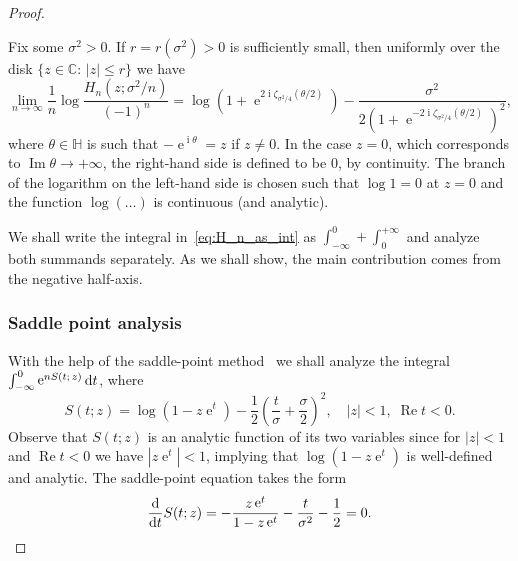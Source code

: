 \documentclass[AHL,Unicode,longabstracts,published]{cedram}
\DeclareMathOperator{\Ree}{Re}
\DeclareMathOperator{\Imm}{Im}
\DeclareMathOperator{\eee}{e}
\DeclareMathOperator{\ii}{i}
\newcommand{\bH}{\mathbb{H}}
\newcommand{\C}{\mathbb{C}}
\newcommand*\dint{\text{\normalfont d}}
\begin{document}
\begin{proof}
\begin{prop}\label{prop:log_asympt_H_n_small_z}
Fix some $\sigma^2>0$. If $r=r(\sigma^2)>0$ is sufficiently small, then uniformly over the disk $\{z\in \C:\, |z|\leq r\}$ we have
\[
\lim_{n\to\infty}
\frac 1n \log \frac {H_n\left(z;\sigma^2/n\right)}{(-1)^n} =
\log \left(1+\eee^{2\ii \zeta_{\sigma^2/4}(\theta/2)}\right) - \frac{\sigma^2}{2\left(1+ \eee^{-2 \ii \zeta_{\sigma^2/4}(\theta/2)}\right)^2},
\]
where $\theta\in \bH$ is such that $-\eee^{\ii \theta} = z$ if $z\neq 0$. In the case $z=0$, which corresponds to $\Imm \theta \to +\infty$, the right-hand side is defined to be $0$, by continuity. The branch of the logarithm on the left-hand side is chosen such that $\log 1=0$ at $z=0$ and the function $\log(\ldots)$ is continuous (and analytic).
\end{prop}



We shall write the integral in~\eqref{eq:H_n_as_int} as $\int_{-\infty}^0 + \int_{0}^{+\infty}$ and analyze both summands separately. As we shall show, the main contribution comes from the negative half-axis.


\subsubsection*{Saddle point analysis}
With the help of the saddle-point method~\cite[\S 45.4, p.~423]{sidorov_fedoryuk_shabunin_book} we shall analyze the integral $\int_{-\infty}^0 \eee^{n S(t;\,z)} \dint t$, where
\begin{equation}\label{eq:S_def}
S(t;z) = \log (1-z\eee^t) - \frac 12 \left(\frac{t}{\sigma} + \frac \sigma 2\right)^2,
\quad |z|<1, \; \Ree t < 0.
\end{equation}
Observe that $S(t;z)$ is an analytic function of its two variables since for $|z|< 1$ and $\Ree t < 0$ we have $|z\eee^t| < 1$, implying that $\log (1-z \eee^t)$ is well-defined and analytic. The saddle-point equation takes the form
\begin{equation}\label{eq:saddle_point}
\frac{\dint}{\dint t} S(t; z) = - \frac{z\eee^t}{1 - z \eee^{t}} - \frac {t}{\sigma^2} - \frac 12 = 0.
\end{equation}


\end{proof}
\end{document}
